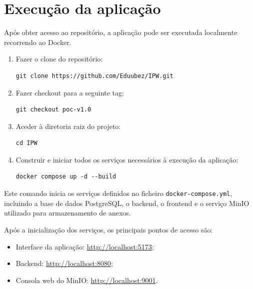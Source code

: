 \documentclass[11pt,a4paper]{article}
\begin{document}
\section{Execução da aplicação}

Após obter acesso ao repositório, a aplicação pode ser executada localmente recorrendo ao Docker.

\begin{enumerate}
  \item Fazer o clone do repositório:

        \begin{lstlisting}[style=command]
git clone https://github.com/Eduubez/IPW.git
        \end{lstlisting}

  \item Fazer checkout para a seguinte tag:

        \begin{lstlisting}[style=command]
git checkout poc-v1.0
        \end{lstlisting}

  \item Aceder à diretoria raiz do projeto:

        \begin{lstlisting}[style=command]
cd IPW
        \end{lstlisting}

  \item Construir e iniciar todos os serviços necessários à execução da aplicação:

        \begin{lstlisting}[style=command]
docker compose up -d --build
        \end{lstlisting}
\end{enumerate}

Este comando inicia os serviços definidos no ficheiro \texttt{docker-compose.yml}, incluindo a base de dados PostgreSQL, o backend, o frontend e o serviço MinIO utilizado para armazenamento de anexos.

Após a inicialização dos serviços, os principais pontos de acesso são:

\begin{itemize}
  \item Interface da aplicação: \url{http://localhost:5173};
  \item Backend: \url{http://localhost:8080};
  \item Consola web do MinIO: \url{http://localhost:9001}.
\end{itemize}
\end{document}
